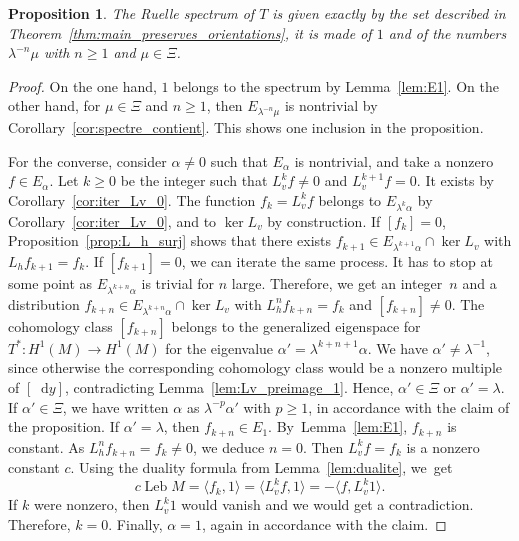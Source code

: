 \documentclass[JEP,XML,SOM,Unicode]{cedram}
\newcommand{\dd}{\mathop{}\!\mathrm{d}}
\DeclareMathOperator{\Leb}{Leb}
\newtheorem{prop}[thm]{Proposition}
\theoremstyle{definition}
\numberwithin{equation}{section}
\begin{document}
\begin{prop}
\label{prop:partiel} The Ruelle spectrum of $T$ is given exactly by the set
described in Theorem~\ref{thm:main_preserves_orientations}, \ie it is made
of $1$ and of the numbers $\lambda^{-n} \mu$ with $n\geq 1$ and $\mu \in
\Xi$.
\end{prop}
\begin{proof}
On the one hand, $1$ belongs to the spectrum by Lemma~\ref{lem:E1}. On the
other hand, for $\mu \in \Xi$ and $n\geq 1$, then $E_{\lambda^{-n} \mu}$ is
nontrivial by Corollary~\ref{cor:spectre_contient}. This shows one inclusion
in the proposition.

For the converse, consider $\alpha\neq 0$ such that $E_\alpha$ is nontrivial,
and take a nonzero $f \in E_\alpha$. Let $k\geq 0$ be the integer such that
$L_v^k f \neq 0$ and $L_v^{k+1}f=0$. It exists by
Corollary~\ref{cor:iter_Lv_0}. The function $f_k = L_v^k f$ belongs to
$E_{\lambda^k \alpha}$ by Corollary~\ref{cor:iter_Lv_0}, and to $\ker L_v$ by
construction. If $[f_k] = 0$, Proposition~\ref{prop:L_h_surj} shows that
there exists $f_{k+1} \in E_{\lambda^{k+1}\alpha} \cap \ker L_v$ with $L_h
f_{k+1} = f_k$. If $[f_{k+1}] = 0$, we can iterate the same process. It has
to stop at some point as $E_{\lambda^{k+n} \alpha}$ is trivial for $n$ large.
Therefore, we get an integer~$n$ and a distribution $f_{k+n} \in
E_{\lambda^{k+n} \alpha} \cap \ker L_v$ with $L_h^n f_{k+n} = f_k$ and
$[f_{k+n}] \neq 0$. The cohomology class $[f_{k+n}]$ belongs to the
generalized eigenspace for $T^*: H^1(M) \to H^1(M)$ for the eigenvalue
$\alpha' = \lambda^{k+n+1} \alpha$. We have $\alpha' \neq \lambda^{-1}$,
since otherwise the corresponding cohomology class would be a nonzero
multiple of $[\dd y]$, contradicting Lemma~\ref{lem:Lv_preimage_1}. Hence,
$\alpha' \in \Xi$ or $\alpha' = \lambda$. If $\alpha' \in \Xi$, we have
written $\alpha$ as $\lambda^{-p} \alpha'$ with $p\geq 1$, in accordance with
the claim of the proposition. If $\alpha' = \lambda$, then $f_{k+n} \in E_1$.
By~Lemma~\ref{lem:E1}, $f_{k+n}$ is constant. As $L_h^n f_{k+n} = f_k \neq
0$, we deduce $n = 0$. Then $L_v^k f = f_k$ is a nonzero constant $c$. Using
the duality formula from Lemma~\ref{lem:dualite}, we~get
\begin{equation*}
c \Leb M = \langle f_k, 1 \rangle = \langle L_v^k f, 1 \rangle
= - \langle f, L_v^k 1 \rangle.
\end{equation*}
If $k$ were nonzero, then $L_v^k 1$ would vanish and we would get a
contradiction. Therefore, $k=0$. Finally, $\alpha=1$, again in accordance
with the claim.
\end{proof}
\end{document}
